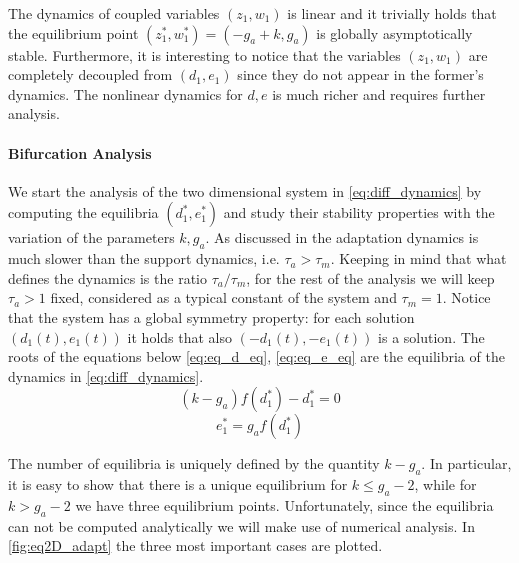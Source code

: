 The dynamics of coupled variables $(z_1, w_1)$ is linear and it trivially holds that the equilibrium point $(z_1^*,w_1^*)=(-g_a+k, g_a)$ is globally asymptotically stable. Furthermore, it is interesting to notice that the variables  $(z_1, w_1)$ are completely decoupled from $(d_1, e_1)$ since they do not appear in the former's dynamics. The nonlinear dynamics for $d, e$ is much richer and requires further analysis. 

\paragraph{Bifurcation Analysis}
We start the analysis of the two dimensional system in \cref{eq:diff_dynamics} by computing the equilibria $(d_1^*,e_1^*)$ and study their stability properties with the variation of the parameters $k, g_a$. As discussed in \cite{LansnerFRC} the adaptation dynamics is much slower than the support dynamics, i.e. $\tau_a > \tau_m$. Keeping in mind that what defines the dynamics is the ratio $\tau_a/\tau_m$, for the rest of the analysis we will keep $\tau_a>1$ fixed, considered as a typical constant of the system and $\tau_m=1$. Notice that the system has a global symmetry property: for each solution $(d_1(t), e_1(t))$ it holds that also $(-d_1(t), -e_1(t))$ is a solution. The roots of the equations below \eqref{eq:eq_d_eq}, \eqref{eq:eq_e_eq} are the equilibria of the dynamics in \eqref{eq:diff_dynamics}.
\begin{equation}
 (k - g_a)f(d_1^*) - d_1^* = 0
\label{eq:eq_d_eq}
\end{equation}
\begin{equation}
e_1^* = g_a f(d_1^*)
\label{eq:eq_e_eq}
\end{equation}

The number of equilibria is uniquely defined by the quantity $k-g_a$. In particular, it is easy to show that there is a unique equilibrium for $k \leq g_a-2$, while for $k > g_a-2$ we have three equilibrium points. Unfortunately, since the equilibria can not be computed analytically we will make use of numerical analysis. In \cref{fig:eq2D_adapt} the three most important cases are plotted.

